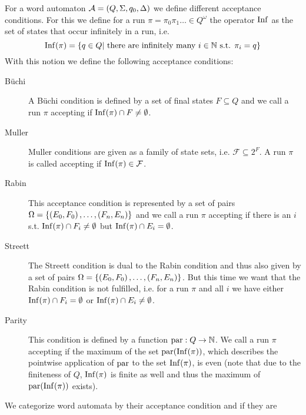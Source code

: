 \begin{definition}
  For a word automaton $\mathcal{A} = \left(Q, \Sigma, q_{0}, \Delta\right)$ we
  define different acceptance conditions. For this we define for a run
  $\pi = \pi_{0}\pi_{1}\dots\in Q^{\omega}$ the operator
  $\operatorname{Inf}$ as the set of states that occur infinitely in a run, i.e.
  \begin{equation*}
    \operatorname{Inf}(\pi) = \left\{q\in Q\middle| \text{ there are infinitely many }
    i\in\mathbb{N} \text{ s.t. } \pi_{i} = q\right\}
  \end{equation*}
  With this notion we define the following acceptance conditions:
  \begin{description}
    \item [Büchi] A Büchi condition is defined by a set of final states
      $F\subseteq Q$ and we call a run $\pi$ accepting if
      $\operatorname{Inf}(\pi)\cap F\neq\emptyset$.
    \item [Muller] Muller conditions are given as a family of state sets, i.e.
      $\mathcal{F}\subseteq 2^{F}$. A run $\pi$ is called accepting if
      $\operatorname{Inf}(\pi)\in\mathcal{F}$.
    \item [Rabin] This acceptance condition is represented by a set of pairs\\
      $\Omega = \left\{\left(E_{0}, F_{0}\right), \dots, \left(F_{n}, E_{n}\right)\right\}$ and we
      call a run $\pi$ accepting if there is an $i$ s.t.
      $\operatorname{Inf}(\pi)\cap F_{i}\neq\emptyset$ but $\operatorname{Inf}(\pi)\cap E_{i} = \emptyset$.
    \item [Streett] The Streett condition is dual to the Rabin condition and
      thus also given by a set of pairs
      $\Omega = \left\{\left(E_{0}, F_{0}\right), \dots, \left(F_{n}, E_{n}\right)\right\}$. But
      this time we want that the Rabin condition is not fulfilled, i.e. for a
      run $\pi$ and all $i$ we have either $\operatorname{Inf}(\pi)\cap F_{i} = \emptyset$ or
      $\operatorname{Inf}(\pi)\cap E_{i} \neq \emptyset$.
    \item [Parity]  This condition is defined
      by a function
      $\operatorname{par}:Q\rightarrow \mathbb{N}$. We call a run $\pi$ accepting if the
      maximum of the set $\operatorname{par}(\operatorname{Inf}(\pi))$, which describes the pointwise
      application of $\operatorname{par}$ to the set $\operatorname{Inf}(\pi)$, is even (note that due
      to the finiteness of $Q$, $\operatorname{Inf}(\pi)$ is finite as well and thus the
      maximum of $\operatorname{par}(\operatorname{Inf}(\pi))$ exists).
  \end{description}
\end{definition}
We categorize word automata by their acceptance condition and if they are
